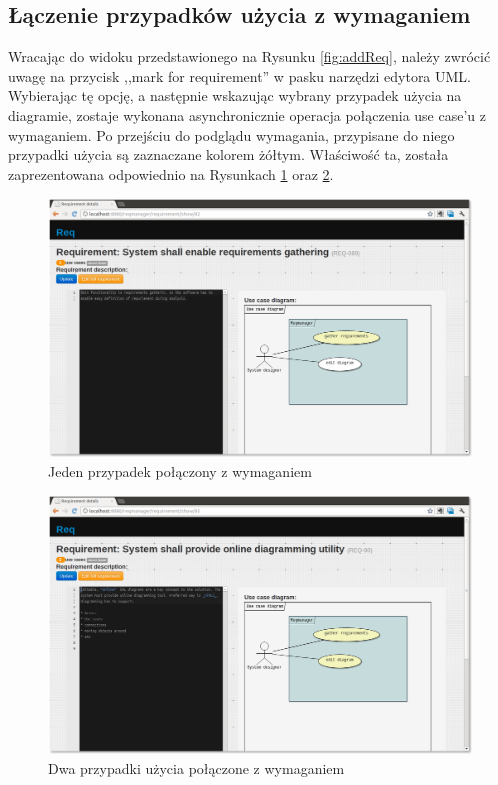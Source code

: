     \subsection{Łączenie przypadków użycia z wymaganiem}

      Wracając do widoku przedstawionego na Rysunku \ref{fig:addReq}, należy zwrócić uwagę na przycisk ,,mark for requirement'' w pasku narzędzi edytora UML. Wybierając tę opcję, a następnie wskazując wybrany przypadek użycia na diagramie, zostaje wykonana asynchronicznie operacja połączenia use case'u z wymaganiem. Po przejściu do podglądu wymagania, przypisane do niego przypadki użycia są zaznaczane kolorem żółtym. Właściwość ta, została zaprezentowana odpowiednio na Rysunkach \ref{fig:reqShow1} oraz \ref{fig:reqShow2}.

      \begin{figure}[t]
        \centering
        \includegraphics[width=1.0\textwidth]{img/tut_11.png}
        \caption{Jeden przypadek połączony z wymaganiem}
        \label{fig:reqShow1}
      \end{figure}
      \begin{figure}[t]
        \centering
        \includegraphics[width=1.0\textwidth]{img/tut_10.png}
        \caption{Dwa przypadki użycia połączone z wymaganiem}
        \label{fig:reqShow2}
      \end{figure}

